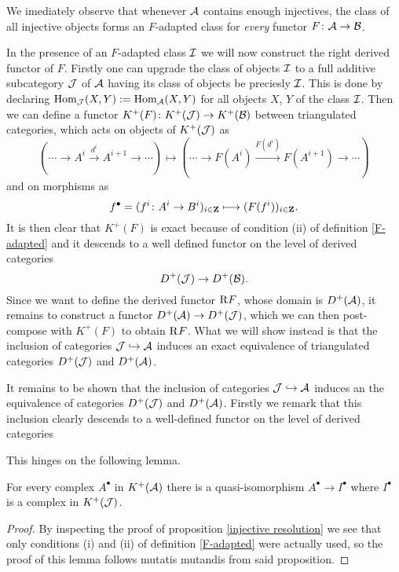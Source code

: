 \begin{remark}
    We imediately observe that whenever $\mathcal A$ contains enough injectives, the class of all injective objects forms an $F$-adapted class for \emph{every} functor $F\colon \mathcal A \to \mathcal B$.
\end{remark}

In the presence of an $F$-adapted class $\mathcal I$ we will now construct the right derived functor of $F$. Firstly one can upgrade the class of objects $\mathcal I$ to a full additive subcategory $\mathcal J$ of $\mathcal A$ having its class of objects be preciesly $\mathcal I$. This is done by declaring $\operatorname{Hom}_\mathcal J(X, Y) := \operatorname{Hom}_\mathcal A(X, Y)$ for all objects $X$, $Y$ of the class $\mathcal I$. Then we can define a functor $K^+(F) \colon K^+(\mathcal J) \to K^+(\mathcal B)$ between triangulated categories, which acts on objects of $K^+(\mathcal J)$ as 
\[
    \left(\cdots \to A^i \xrightarrow{d^i} A^{i+1} \to \cdots\right) \longmapsto \left(\cdots \to F(A^i) \xrightarrow{F(d^i)} F(A^{i+1}) \to \cdots\right)
\]
and on morphisms as
\[
    f^\bullet = (f^i \colon A^i \to B^i)_{i \in \mathbf Z} \longmapsto (F(f^i))_{i \in \mathbf Z}.
\]
It is then clear that $K^+(F)$ is exact because of condition (ii) of definition \ref{F-adapted} and it descends to a well defined functor on the level of derived categories 
\[
    D^+(\mathcal J) \to D^+(\mathcal B).
\]
Since we want to define the derived functor $\text{R}^{}F$, whose domain is $D^+(\mathcal A)$, it remains to construct a functor $D^+(\mathcal A) \to D^+(\mathcal J)$, which we can then post-compose with $K^+(F)$ to obtain $\text{R}^{}F$. What we will show instead is that the inclusion of categories $\mathcal J \hookrightarrow \mathcal A$ induces an exact equivalence of triangulated categories $D^+(\mathcal J)$ and $D^+(\mathcal A)$.

It remains to be shown that the inclusion of categories $\mathcal J \hookrightarrow \mathcal A$ induces an the equivalence of categories $D^+(\mathcal J)$ and $D^+(\mathcal A)$. Firstly we remark that this inclusion clearly descends to a well-defined functor on the level of derived categories

This hinges on the following lemma.

\begin{lemma}
    \label{F-acyclic resolutions}
    For every complex $A^\bullet$ in $K^+(\mathcal A)$ there is a quasi-isomorphism $A^\bullet \to I^\bullet$ where $I^\bullet$ is a complex in $K^+(\mathcal J)$.
\end{lemma}

\begin{proof}
    By inspecting the proof of proposition \ref{injective resolution} we see that only conditions (i) and (ii) of definition \ref{F-adapted} were actually used, so the proof of this lemma follows mutatis mutandis from said proposition.
\end{proof}



